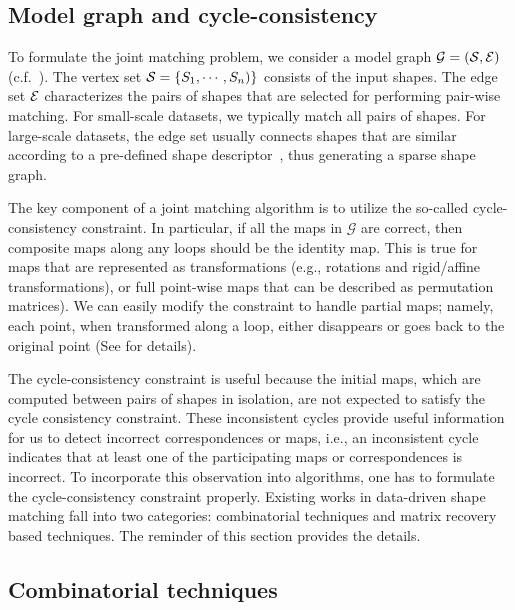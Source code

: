 \subsection{Model graph and cycle-consistency}

To formulate the joint matching problem, we consider a model graph $\mathcal{G} = (\mathcal{S}, \mathcal{E})$ (c.f.~\cite{Huber:2002:Thesis}). The vertex set $\mathcal{S} = \{S_1, \cdots, S_{n})\}$ consists of the input shapes. The edge set $\mathcal{E}$ characterizes the pairs of shapes that are selected for performing pair-wise matching. For small-scale datasets, we typically match all pairs of shapes. For large-scale datasets, the edge set usually connects shapes that are similar according to a pre-defined shape descriptor~\cite{Kim:2012:FC,Huang:2013:FSL}, thus generating a sparse shape graph.

The key component of a joint matching algorithm is to utilize the so-called cycle-consistency constraint.  In particular, if all the maps in $\mathcal{G}$ are correct, then composite maps along any loops should be the identity map. This is true for maps that are represented as transformations (e.g., rotations and rigid/affine transformations), or full point-wise maps that can be described as permutation matrices). We can easily modify the constraint to handle partial maps; namely, each point, when transformed along a loop, either disappears or goes back to the original point (See \cite{Huang:2014:FMN} for details).

The cycle-consistency constraint is useful because the initial maps, which are computed between pairs of shapes in isolation, are not expected to satisfy the cycle consistency constraint.  These inconsistent cycles provide useful information for us to detect incorrect correspondences or maps, i.e., an inconsistent cycle indicates that at least one of the participating maps or correspondences is incorrect. To incorporate this observation into algorithms, one has to formulate the cycle-consistency constraint properly. Existing works in data-driven shape matching fall into two categories: combinatorial techniques and matrix recovery based techniques.  The reminder of this section provides the details.



\subsection{Combinatorial techniques}

